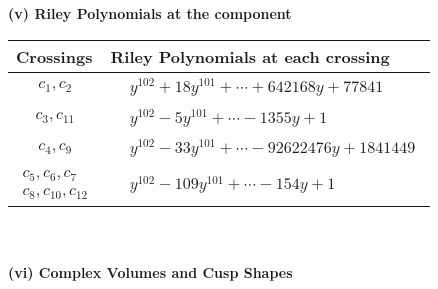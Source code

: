 \documentclass[1p]{elsarticle_modified}
\theoremstyle{definition}
\begin{document}
\newpage\renewcommand{\arraystretch}{1}
\flushleft \textbf{(v) Riley Polynomials at the component}\newline \\
\begin{tabular}{m{50pt}|m{274pt}}
Crossings & \hspace{64pt}Riley Polynomials at each crossing \\
\hline $$\begin{aligned}c_{1},c_{2}\end{aligned}$$&$\begin{aligned}
&y^{102}+18 y^{101}+\cdots+642168 y+77841
\end{aligned}$\\
\hline $$\begin{aligned}c_{3},c_{11}\end{aligned}$$&$\begin{aligned}
&y^{102}-5 y^{101}+\cdots-1355 y+1
\end{aligned}$\\
\hline $$\begin{aligned}c_{4},c_{9}\end{aligned}$$&$\begin{aligned}
&y^{102}-33 y^{101}+\cdots-92622476 y+1841449
\end{aligned}$\\
\hline $$\begin{aligned}c_{5},c_{6},c_{7}\\c_{8},c_{10},c_{12}\end{aligned}$$&$\begin{aligned}
&y^{102}-109 y^{101}+\cdots-154 y+1
\end{aligned}$\\
\hline
\end{tabular}\\~\\
\newpage\flushleft \textbf{(vi) Complex Volumes and Cusp Shapes}
\end{document}
